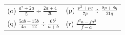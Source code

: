 \begin{enumerate}[noitemsep, label=\textbf{\arabic*}. ]
{\begin{tabular}[t]{|l|l|}
     \tabularnewline\cline{1-1}\cline{2-2}
        (o) $\frac{{a}^{2}+2a}{5}÷\frac{2a+4}{20}$\hspace{1ex} &
        (p) $\frac{{p}^{2}+pq}{7p}÷\frac{8p+8q}{21q}$\hspace{1ex}%
     \tabularnewline\cline{1-1}\cline{2-2}
        (q) $\frac{5ab-15b}{4a-12}÷\frac{6{b}^{2}}{a+b}$\hspace{1ex} &
        (r) $\frac{{f}^{2}a-f{a}^{2}}{f-a}$%
     \tabularnewline\cline{1-1}\cline{2-2}
    \end{tabular}} %
\end{enumerate}
